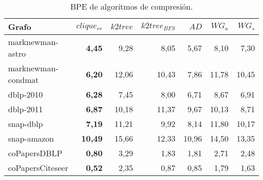 \begin{table}
	\caption{BPE de algoritmos de compresión.}
	\label{table:BPEcomp}
	\centering
	\begin{tabular}{l|r|r|r|r|r|r}
		\toprule
		Grafo & $clique_{rr}$ & $k2tree$ & $k2tree_{BFS}$ & $AD$ & $WG_{a}$ & $WG_{s}$\\
		\midrule
		marknewman-astro & \textbf{4,45} & 9,28 & 8,05 & 5,67 & 8,10 & 7,30\\
		marknewman-condmat & \textbf{6,20} & 12,06 & 10,43 & 7,86 & 11,78 & 10,45\\
		dblp-2010 & \textbf{6,28} & 7,45 & 8,00 & 6,71 & 8,67 & 6,91 \\
        dblp-2011 & \textbf{6,87} & 10,18 & 11,37 & 9,67 & 10,13 & 8,71 \\
		snap-dblp & \textbf{7,19} & 11,21 & 9,92 & 8,14 & 11,80 & 10,17 \\
        snap-amazon & \textbf{10,49} & 15,66 & 12,33 & 10,96 & 14,50 & 13,35 \\
        coPapersDBLP & \textbf{0,80} & 3,29 & 1,83 & 1,81 & 2,71 & 2,48 \\
        coPapersCiteseer & \textbf{0,52} & 2,35 & 0,87 & 0,85 & 1,79 &  1,63 \\
		\bottomrule
	\end{tabular}
\end{table}
